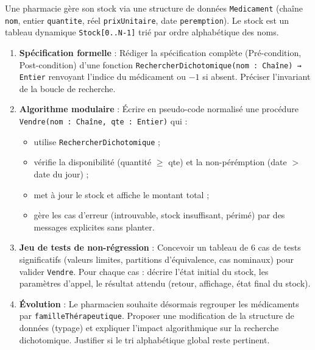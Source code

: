 \documentclass[11pt]{article}
\begin{document}
\begin{exercice}
Une pharmacie gère son stock via une structure de données \texttt{Medicament} (chaîne \texttt{nom}, entier \texttt{quantite}, réel \texttt{prixUnitaire}, date \texttt{peremption}). Le stock est un tableau dynamique \texttt{Stock[0..N-1]} trié par ordre alphabétique des noms.

\begin{enumerate}
\item \textbf{Spécification formelle} : Rédiger la spécification complète (Pré-condition, Post-condition) d'une fonction \texttt{RechercherDichotomique(nom : Chaîne) → Entier} renvoyant l'indice du médicament ou $-1$ si absent. Préciser l'invariant de la boucle de recherche.
\item \textbf{Algorithme modulaire} : Écrire en pseudo-code normalisé une procédure \texttt{Vendre(nom : Chaîne, qte : Entier)} qui :
      \begin{itemize}
        \item utilise \texttt{RechercherDichotomique} ;
        \item vérifie la disponibilité (quantité $\ge$ qte) et la non-pérémption (date $>$ date du jour) ;
        \item met à jour le stock et affiche le montant total ;
        \item gère les cas d'erreur (introuvable, stock insuffisant, périmé) par des messages explicites sans planter.
      \end{itemize}
\item \textbf{Jeu de tests de non-régression} : Concevoir un tableau de 6 cas de tests significatifs (valeurs limites, partitions d'équivalence, cas nominaux) pour valider \texttt{Vendre}. Pour chaque cas : décrire l'état initial du stock, les paramètres d'appel, le résultat attendu (retour, affichage, état final du stock).
\item \textbf{Évolution} : Le pharmacien souhaite désormais regrouper les médicaments par \texttt{familleThérapeutique}. Proposer une modification de la structure de données (typage) et expliquer l'impact algorithmique sur la recherche dichotomique. Justifier si le tri alphabétique global reste pertinent.
\end{enumerate}
\end{exercice}
\end{document}
